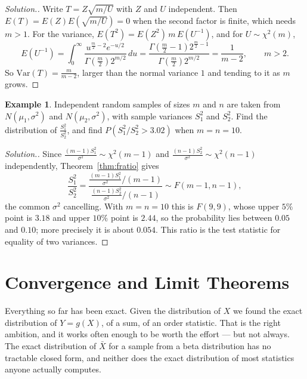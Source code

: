 \documentclass[12pt,a4paper]{report}
\theoremstyle{definition}
\newtheorem{example}[thm]{Example}
\theoremstyle{plain}
\newenvironment{solution}
  {\renewcommand{\qedsymbol}{}\begin{proof}[\textit{Solution}.]}
  {\end{proof}}
\begin{document}
\begin{solution}
Write $T = Z\sqrt{m/U}$ with $Z$ and $U$ independent. Then $E(T) = E(Z)E\left(
\sqrt{m/U}\right) = 0$ when the second factor is finite, which needs $m>1$. For
the variance, $E(T^2) = E(Z^2)\,m\,E\left(U^{-1}\right)$, and for
$U\sim\chi^2(m)$,
\[E\left(U^{-1}\right) = \int_0^\infty\frac{u^{\frac m2 - 2}e^{-u/2}}{\Gamma\left(
\frac m2\right)2^{m/2}}\,du = \frac{\Gamma\left(\frac m2 - 1\right)2^{\frac m2 -
1}}{\Gamma\left(\frac m2\right)2^{m/2}} = \frac{1}{m - 2},\qquad m>2 .\]
So $\text{Var}(T) = \frac{m}{m - 2}$, larger than the normal variance $1$ and
tending to it as $m$ grows.
\end{solution}

\begin{example}
\label{ex:fvariances}
Independent random samples of sizes $m$ and $n$ are taken from
$N(\mu_1,\sigma^2)$ and $N(\mu_2,\sigma^2)$, with sample variances $S_1^2$ and
$S_2^2$. Find the distribution of $\frac{S_1^2}{S_2^2}$, and find
$P\left(S_1^2/S_2^2>3.02\right)$ when $m = n = 10$.
\end{example}

\begin{solution}
Since $\frac{(m - 1)S_1^2}{\sigma^2}\sim\chi^2(m - 1)$ and
$\frac{(n - 1)S_2^2}{\sigma^2}\sim\chi^2(n - 1)$ independently,
Theorem~\ref{thm:fratio} gives
\[\frac{S_1^2}{S_2^2} = \frac{\frac{(m-1)S_1^2}{\sigma^2}\big/(m - 1)}{\frac{(n -
1)S_2^2}{\sigma^2}\big/(n - 1)}\sim F(m - 1, n - 1) ,\]
the common $\sigma^2$ cancelling. With $m = n = 10$ this is $F(9,9)$, whose upper
$5\%$ point is $3.18$ and upper $10\%$ point is $2.44$, so the probability lies
between $0.05$ and $0.10$; more precisely it is about $0.054$. This ratio is the
test statistic for equality of two variances.
\end{solution}


\section{Convergence and Limit Theorems}

Everything so far has been exact. Given the distribution of $X$ we found the exact
distribution of $Y=g(X)$, of a sum, of an order statistic. That is the right
ambition, and it works often enough to be worth the effort --- but not always. The
exact distribution of $\bar X$ for a sample from a beta distribution has no
tractable closed form, and neither does the exact distribution of most statistics
anyone actually computes.
\end{document}
